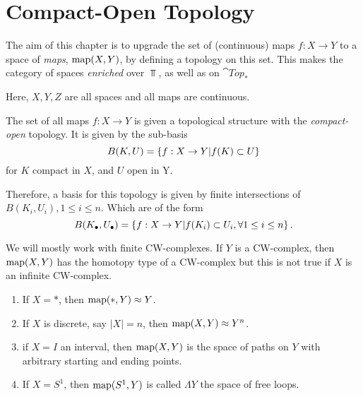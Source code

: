 \documentclass[main.tex]{subfiles}
\begin{document}
\chapter{Compact-Open Topology}

The aim of this chapter is to upgrade the set of (continuous) maps \(f: X \to Y\) to a space of \emph{maps}, \(\operatorname{map}(X,Y)\), by defining a topology on this set.
This makes the category of spaces \emph{enriched} over \(\Top\), as well as on \(\cat{Top_*}\)

\begin{rem}
	Here, \(X, Y, Z\) are all spaces and all maps are continuous.
\end{rem}

\begin{defn}
	The set of all maps \(f: X \to Y\) is given a topological structure with the \emph{compact-open} topology.
	It is given by the sub-basis
	\[
		B(K, U) = \left\{f: X \to Y | f(K) \subset U\right\}
	\]
	for \(K\) compact in \(X\), and \(U\) open in Y.
\end{defn}

\begin{rem}
	Therefore, a basis for this topology is given by finite intersections of \(B(K_i, U_i), 1 \leq i \leq n\).
	Which are of the form
	\[
		B(K_\bullet, U_\bullet) = \left\{f: X \to Y | f(K_i) \subset U_i, \forall 1 \leq i \leq n\right\}.
	\]
\end{rem}

\begin{rem}
	We will mostly work with finite CW-complexes.
	If \(Y\) is a CW-complex, then \(\operatorname{map}(X,Y)\) has the homotopy type of a CW-complex but this is not true if \(X\) is an infinite CW-complex.

\end{rem}


\begin{example}
	\begin{enumerate}
		\item If \(X = \ast\), then \(\operatorname{map}(\ast, Y) \approx Y\).
		\item If \(X\) is discrete, say \(|X| = n\), then \(\operatorname{map}(X,Y) \approx Y^n \).
		\item if \(X = I\) an interval, then \(\operatorname{map}(X,Y)\) is the space of paths on \(Y\) with arbitrary starting and ending points.
		\item If \(X = S^1 \), then \(\operatorname{map}(S^1, Y)\) is called \(\Lambda Y\) the space of free loops.
	\end{enumerate}
\end{example}
\end{document}
